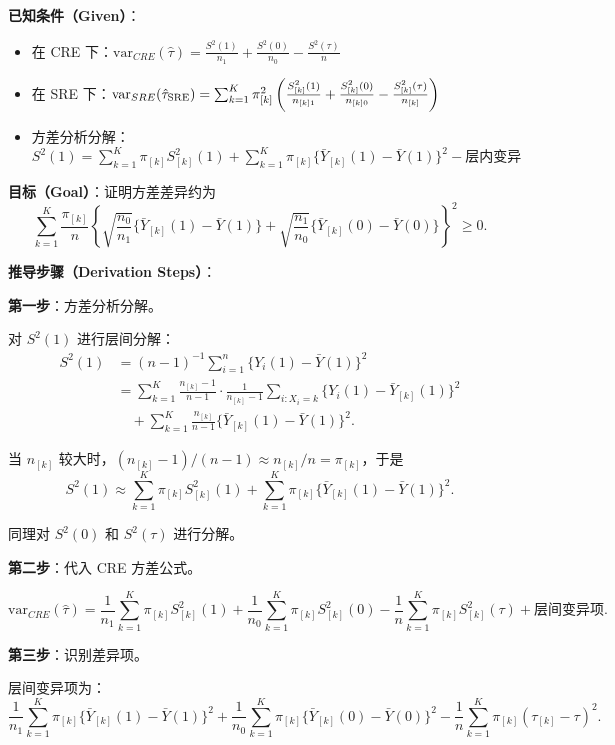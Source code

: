 \textbf{已知条件（Given）}：
\begin{itemize}
  \item 在 CRE 下：$\text{var}_{CRE}(\hat{\tau}) = \frac{S^2(1)}{n_1} + \frac{S^2(0)}{n_0} - \frac{S^2(\tau)}{n}$
  \item 在 SRE 下：$\text{var}_{SRE}(\hat{\tau}_{\text{SRE}}) = \sum_{k=1}^K \pi_{[k]}^2 \left( \frac{S_{[k]}^2(1)}{n_{[k]1}} + \frac{S_{[k]}^2(0)}{n_{[k]0}} - \frac{S_{[k]}^2(\tau)}{n_{[k]}} \right)$
  \item 方差分析分解：$S^2(1) = \sum_{k=1}^K \pi_{[k]} S_{[k]}^2(1) + \sum_{k=1}^K \pi_{[k]} \{\bar{Y}_{[k]}(1) - \bar{Y}(1)\}^2 - \text{层内变异}$
\end{itemize}

\textbf{目标（Goal）}：证明方差差异约为
\[
\sum_{k=1}^K \frac{\pi_{[k]}}{n} \left\{ \sqrt{\frac{n_0}{n_1}} \{\bar{Y}_{[k]}(1) - \bar{Y}(1)\} + \sqrt{\frac{n_1}{n_0}} \{\bar{Y}_{[k]}(0) - \bar{Y}(0)\} \right\}^2 \geq 0.
\]

\textbf{推导步骤（Derivation Steps）}：

\textbf{第一步}：方差分析分解。

对 $S^2(1)$ 进行层间分解：
\[
\begin{aligned}
S^2(1) & = (n-1)^{-1} \sum_{i=1}^n \{Y_i(1) - \bar{Y}(1)\}^2 \\
& = \sum_{k=1}^K \frac{n_{[k]}-1}{n-1} \cdot \frac{1}{n_{[k]}-1} \sum_{i: X_i=k} \{Y_i(1) - \bar{Y}_{[k]}(1)\}^2 \\
& \quad + \sum_{k=1}^K \frac{n_{[k]}}{n-1} \{\bar{Y}_{[k]}(1) - \bar{Y}(1)\}^2.
\end{aligned}
\]

当 $n_{[k]}$ 较大时，$(n_{[k]}-1)/(n-1) \approx n_{[k]}/n = \pi_{[k]}$，于是
\[
S^2(1) \approx \sum_{k=1}^K \pi_{[k]} S_{[k]}^2(1) + \sum_{k=1}^K \pi_{[k]} \{\bar{Y}_{[k]}(1) - \bar{Y}(1)\}^2.
\]

同理对 $S^2(0)$ 和 $S^2(\tau)$ 进行分解。

\textbf{第二步}：代入 CRE 方差公式。

\[
\text{var}_{CRE}(\hat{\tau}) = \frac{1}{n_1} \sum_{k=1}^K \pi_{[k]} S_{[k]}^2(1) + \frac{1}{n_0} \sum_{k=1}^K \pi_{[k]} S_{[k]}^2(0) - \frac{1}{n} \sum_{k=1}^K \pi_{[k]} S_{[k]}^2(\tau) + \text{层间变异项}.
\]

\textbf{第三步}：识别差异项。

层间变异项为：
\[
\frac{1}{n_1} \sum_{k=1}^K \pi_{[k]} \{\bar{Y}_{[k]}(1) - \bar{Y}(1)\}^2 + \frac{1}{n_0} \sum_{k=1}^K \pi_{[k]} \{\bar{Y}_{[k]}(0) - \bar{Y}(0)\}^2 - \frac{1}{n} \sum_{k=1}^K \pi_{[k]} (\tau_{[k]} - \tau)^2.
\]

